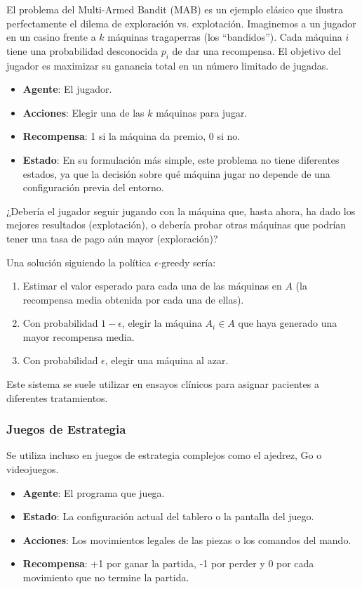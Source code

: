 \documentclass[12pt,a4paper]{book}
\begin{document}
El problema del Multi-Armed Bandit (MAB) \cite{MAB} es un ejemplo clásico que ilustra perfectamente el dilema de exploración vs. explotación. Imaginemos a un jugador en un casino frente a $k$ máquinas tragaperras (los ``bandidos'').
Cada máquina $i$ tiene una probabilidad desconocida $p_i$ de dar una recompensa. El objetivo del jugador es maximizar su ganancia total en un número limitado de jugadas.

\begin{itemize}
    \item \textbf{Agente}: El jugador.
    \item \textbf{Acciones}: Elegir una de las $k$ máquinas para jugar.
    \item \textbf{Recompensa}: 1 si la máquina da premio, 0 si no.
    \item \textbf{Estado}: En su formulación más simple, este problema no tiene diferentes estados, ya que la decisión sobre qué máquina jugar no depende de una configuración previa del entorno.
\end{itemize}

¿Debería el jugador seguir jugando con la máquina que, hasta ahora, ha dado los mejores resultados (explotación), o debería probar otras máquinas que podrían tener una tasa de pago aún mayor (exploración)?

Una solución siguiendo la política $\epsilon$-greedy sería:
\begin{enumerate}
    \item Estimar el valor esperado para cada una de las máquinas en $A$ (la recompensa media obtenida por cada una de ellas).
    \item Con probabilidad $1-\epsilon$, elegir la máquina $A_i \in A$ que haya generado una mayor recompensa media.
    \item Con probabilidad $\epsilon$, elegir una máquina al azar.
\end{enumerate}

Este sistema se suele utilizar en ensayos clínicos para asignar pacientes a diferentes tratamientos.

\subsubsection{Juegos de Estrategia}

Se utiliza incluso en juegos de estrategia complejos como el ajedrez, Go o videojuegos.

\begin{itemize}
    \item \textbf{Agente}: El programa que juega.
    \item \textbf{Estado}: La configuración actual del tablero o la pantalla del juego.
    \item \textbf{Acciones}: Los movimientos legales de las piezas o los comandos del mando.
    \item \textbf{Recompensa}: +1 por ganar la partida, -1 por perder y 0 por cada movimiento que no termine la partida.
\end{itemize}
\end{document}
